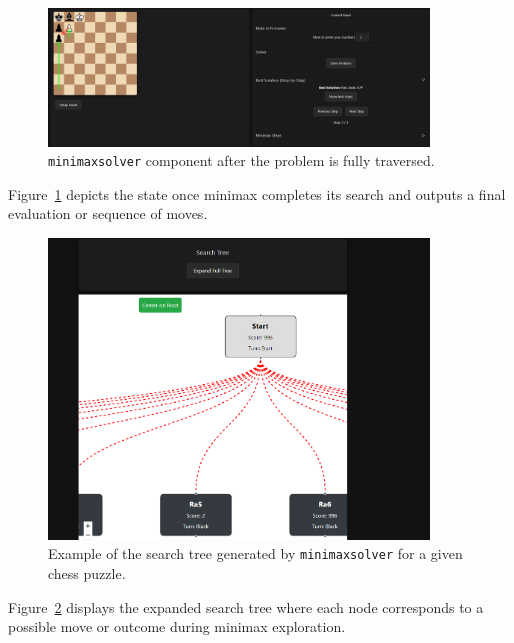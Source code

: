 \documentclass[12pt,a4paper]{article}
\begin{document}
\FloatBarrier
\begin{figure}[htbp]
  \centering
  \includegraphics[width=0.9\textwidth]{figures/Minimaxfinish.png}
  \caption{\texttt{minimaxsolver} component after the problem is fully traversed.}
  \label{fig:minimaxfinished}
\end{figure}

\noindent
Figure~\ref{fig:minimaxfinished} depicts the state once minimax completes 
its search and outputs a final evaluation or sequence of moves.

\FloatBarrier
\begin{figure}[htbp]
  \centering
  \includegraphics[width=0.9\textwidth]{figures/MInimaxtree.png}
  \caption{Example of the search tree generated by \texttt{minimaxsolver} for a given chess puzzle.}
  \label{fig:minimaxtree}
\end{figure}

\noindent
Figure~\ref{fig:minimaxtree} displays the expanded search tree where each node 
corresponds to a possible move or outcome during minimax exploration.
\end{document}
